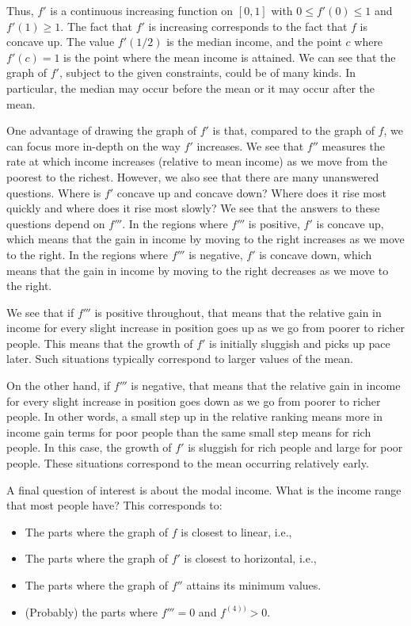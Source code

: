 \documentclass{amsart}
\begin{document}
Thus, $f'$ is a continuous increasing function on $[0,1]$ with $0 \le
f'(0) \le 1$ and $f'(1) \ge 1$. The fact that $f'$ is increasing
corresponds to the fact that $f$ is concave up. The value $f'(1/2)$ is
the median income, and the point $c$ where $f'(c) = 1$ is the point
where the mean income is attained. We can see that the graph of $f'$,
subject to the given constraints, could be of many kinds. In
particular, the median may occur before the mean or it may occur after
the mean.

One advantage of drawing the graph of $f'$ is that, compared to the
graph of $f$, we can focus more in-depth on the way $f'$ increases. We
see that $f''$ measures the rate at which income increases (relative
to mean income) as we move from the poorest to the richest. However,
we also see that there are many unanswered questions. Where is $f'$
concave up and concave down? Where does it rise most quickly and where
does it rise most slowly? We see that the answers to these questions
depend on $f'''$. In the regions where $f'''$ is positive, $f'$ is
concave up, which means that the gain in income by moving to the right
increases as we move to the right. In the regions where $f'''$ is
negative, $f'$ is concave down, which means that the gain in income by
moving to the right decreases as we move to the right.

We see that if $f'''$ is positive throughout, that means that the
relative gain in income for every slight increase in position goes up
as we go from poorer to richer people. This means that the growth of
$f'$ is initially sluggish and picks up pace later. Such situations
typically correspond to larger values of the mean.

On the other hand, if $f'''$ is negative, that means that the relative
gain in income for every slight increase in position goes down as we
go from poorer to richer people. In other words, a small step up in
the relative ranking means more in income gain terms for poor people
than the same small step means for rich people. In this case, the
growth of $f'$ is sluggish for rich people and large for poor
people. These situations correspond to the mean occurring relatively
early.

A final question of interest is about the modal income. What is the
income range that most people have? This corresponds to:

\begin{itemize}
\item The parts where the graph of $f$ is closest to linear, i.e.,
\item The parts where the graph of $f'$ is closest to horizontal, i.e.,
\item The parts where the graph of $f''$ attains its minimum values.
\item (Probably) the parts where $f''' = 0$ and $f^{(4))} > 0$. 
\end{itemize}
\end{document}
